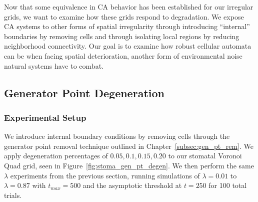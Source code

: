 \documentclass[a4paper,11pt]{article}
\begin{document}
Now that some equivalence in CA behavior has been established for our irregular grids, we want to examine how these grids respond to degradation. We expose CA systems to other forms of spatial irregularity through introducing ``internal'' boundaries by removing cells and through isolating local regions by reducing neighborhood connectivity. Our goal is to examine how robust cellular automata can be when facing spatial deterioration, another form of environmental noise natural systems have to combat.

\subsection{Generator Point Degeneration}
\label{subsec:ch6_gen_pt_degen}
\subsubsection*{Experimental Setup}
We introduce internal boundary conditions by removing cells through the generator point removal technique outlined in Chapter~\ref{subsec:gen_pt_rem}. We apply degeneration percentages of $0.05,0.1, 0.15, 0.20$ to our stomatal Voronoi Quad grid, seen in Figure~\ref{fig:stoma_gen_pt_degen}. We then perform the same $\lambda$ experiments from the previous section, running simulations of $\lambda=0.01$ to $\lambda=0.87$ with $t_{max} = 500$ and the asymptotic threshold at $t=250$ for 100 total trials.
\end{document}
